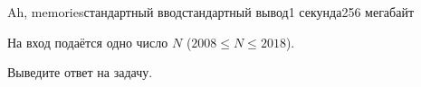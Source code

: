 \begin{problem}{Ah, memories}{стандартный ввод}{стандартный вывод}{1 секунда}{256 мегабайт}



\InputFile
На вход подаётся одно число $N$ ($2008 \le N \le 2018$).

\OutputFile
Выведите ответ на задачу.

\Example

\begin{example}
%
\end{example}

\end{problem}

